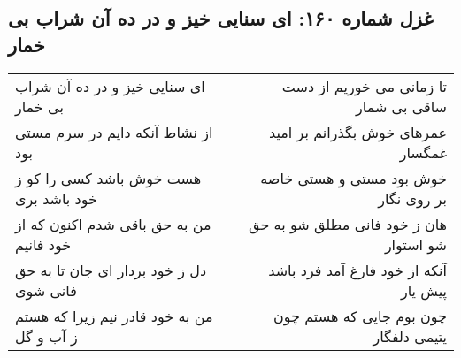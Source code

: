 \begin{center}
\section*{غزل شماره ۱۶۰: ای سنایی خیز و در ده آن شراب بی خمار}
\label{sec:160}
\begin{longtable}{l p{0.5cm} r}
ای سنایی خیز و در ده آن شراب بی خمار
&&
تا زمانی می خوریم از دست ساقی بی شمار
\\
از نشاط آنکه دایم در سرم مستی بود
&&
عمرهای خوش بگذرانم بر امید غمگسار
\\
هست خوش باشد کسی را کو ز خود باشد بری
&&
خوش بود مستی و هستی خاصه بر روی نگار
\\
من به حق باقی شدم اکنون که از خود فانیم
&&
هان ز خود فانی مطلق شو به حق شو استوار
\\
دل ز خود بردار ای جان تا به حق فانی شوی
&&
آنکه از خود فارغ آمد فرد باشد پیش یار
\\
من به خود قادر نیم زیرا که هستم ز آب و گل
&&
چون بوم جایی که هستم چون یتیمی دلفگار
\\
\end{longtable}
\end{center}
